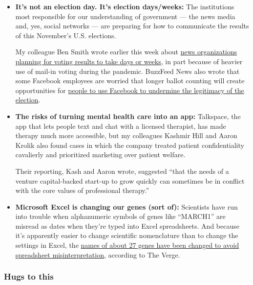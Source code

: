 \begin{itemize}
\item
  \textbf{It's not an election day. It's election days/weeks:} The
  institutions most responsible for our understanding of government ---
  the news media and, yes, social networks --- are preparing for how to
  communicate the results of this November's U.S. elections.

  My colleague Ben Smith wrote earlier this week about
  \href{https://www.nytimes.com/2020/08/02/business/media/election-coverage.html}{news
  organizations planning for voting results to take days or weeks}, in
  part because of heavier use of mail-in voting during the pandemic.
  BuzzFeed News also wrote that some Facebook employees are worried that
  longer ballot counting will create opportunities for
  \href{https://www.buzzfeednews.com/article/craigsilverman/facebook-zuckerberg-what-if-trump-disputes-election-results}{people
  to use Facebook to undermine the legitimacy of the election}.
\item
  \textbf{The risks of turning mental health care into an app:}
  Talkspace, the app that lets people text and chat with a licensed
  therapist, has made therapy much more accessible, but my colleagues
  Kashmir Hill and Aaron Krolik also found cases in which the company
  treated patient confidentiality cavalierly and prioritized marketing
  over patient welfare.

  Their reporting, Kash and Aaron wrote, suggested ``that the needs of a
  venture capital-backed start-up to grow quickly can sometimes be in
  conflict with the core values of professional therapy.''
\item
  \textbf{Microsoft Excel is changing our genes (sort of):} Scientists
  have run into trouble when alphanumeric symbols of genes like
  ``MARCH1'' are misread as dates when they're typed into Excel
  spreadsheets. And because it's apparently easier to change scientific
  nomenclature than to change the settings in Excel, the
  \href{https://www.theverge.com/2020/8/6/21355674/human-genes-rename-microsoft-excel-misreading-dates}{names
  of about 27 genes have been changed to avoid spreadsheet
  misinterpretation}, according to The Verge.
\end{itemize}

\hypertarget{hugs-to-this}{%
\subsubsection{Hugs to this}\label{hugs-to-this}}


